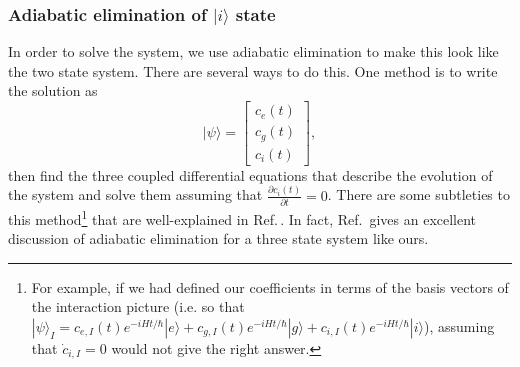 \subsubsection{Adiabatic elimination of $|i\rangle$ state}
In order to solve the system, we use adiabatic elimination to make this look like the two state system. There are several ways to do this. One method is to write the solution as 
\begin{equation} 
|\psi\rangle = 
\begin{bmatrix}c_e(t)\\c_g(t)\\c_i(t)
\end{bmatrix},
\end{equation}
then find the three coupled differential equations that describe the evolution of the system and solve them assuming that $\frac{\partial c_i(t)}{\partial t}=0$. There are some subtleties to this method\footnote{For example, if we had defined our coefficients in terms of the basis vectors of the interaction picture (i.e. so that 
$|\psi\rangle_I=c_{e,I}(t)e^{-iHt/\hbar}|e\rangle+c_{g,I}(t)e^{-iHt/\hbar}|g\rangle+c_{i,I}(t)e^{-iHt/\hbar}|i\rangle$), assuming that $\dot{c}_{i,I}=0$ would not give the right answer.} that are well-explained in Ref.\,\cite{brionLambdaAdiabatic}. In fact, Ref.\,\cite{brionLambdaAdiabatic} gives an excellent discussion of adiabatic elimination for a three state system like ours. 

